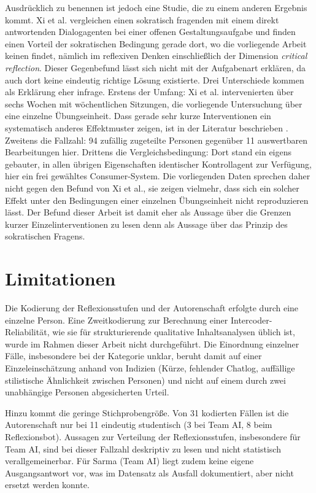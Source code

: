 Ausdrücklich zu benennen ist jedoch eine Studie, die zu einem anderen Ergebnis kommt. Xi et al.
\cite{xiInvestigatingEffectsLLMbased2026} vergleichen einen sokratisch fragenden mit einem direkt
antwortenden Dialogagenten bei einer offenen Gestaltungsaufgabe und finden einen Vorteil der
sokratischen Bedingung gerade dort, wo die vorliegende Arbeit keinen findet, nämlich im reflexiven
Denken einschließlich der Dimension \emph{critical reflection}. Dieser Gegenbefund lässt sich nicht
mit der Aufgabenart erklären, da auch dort keine eindeutig richtige Lösung existierte. Drei
Unterschiede kommen als Erklärung eher infrage. Erstens der Umfang: Xi et al. intervenierten über
sechs Wochen mit wöchentlichen Sitzungen, die vorliegende Untersuchung über eine einzelne
Übungseinheit. Dass gerade sehr kurze Interventionen ein systematisch anderes Effektmuster zeigen,
ist in der Literatur beschrieben \cite{alemdagEffectChatbotsLearning2023}. Zweitens die Fallzahl:
94 zufällig zugeteilte Personen gegenüber 11 auswertbaren Bearbeitungen hier. Drittens die
Vergleichsbedingung: Dort stand ein eigens gebauter, in allen übrigen Eigenschaften identischer
Kontrollagent zur Verfügung, hier ein frei gewähltes Consumer-System. Die vorliegenden Daten
sprechen daher nicht gegen den Befund von Xi et al., sie zeigen vielmehr, dass sich ein solcher
Effekt unter den Bedingungen einer einzelnen Übungseinheit nicht reproduzieren lässt. Der Befund
dieser Arbeit ist damit eher als Aussage über die Grenzen kurzer Einzelinterventionen zu lesen denn
als Aussage über das Prinzip des sokratischen Fragens.

\section{Limitationen}
\label{sec:limitationen}

Die Kodierung der Reflexionsstufen und der Autorenschaft erfolgte durch eine einzelne Person. Eine
Zweitkodierung zur Berechnung einer Intercoder-Reliabilität, wie sie für strukturierende qualitative
Inhaltsanalysen üblich ist, wurde im Rahmen dieser Arbeit nicht durchgeführt. Die Einordnung
einzelner Fälle, insbesondere bei der Kategorie \glqq unklar\grqq{}, beruht damit auf einer
Einzeleinschätzung anhand von Indizien (Kürze, fehlender Chatlog, auffällige stilistische Ähnlichkeit
zwischen Personen) und nicht auf einem durch zwei unabhängige Personen abgesicherten Urteil.

\newpage
Hinzu kommt die geringe Stichprobengröße. Von 31 kodierten Fällen ist die Autorenschaft nur bei 11
eindeutig studentisch (3 bei Team AI, 8 beim Reflexionsbot). Aussagen zur Verteilung der
Reflexionsstufen, insbesondere für Team AI, sind bei dieser Fallzahl deskriptiv zu lesen und nicht
statistisch verallgemeinerbar. Für Sarma (Team AI) liegt zudem keine eigene Ausgangsantwort vor, was
im Datensatz als Ausfall dokumentiert, aber nicht ersetzt werden konnte.

